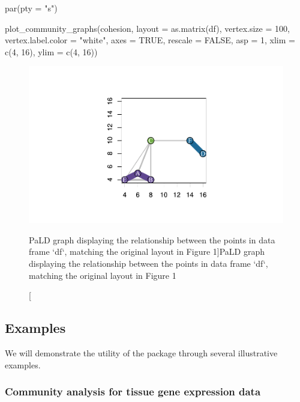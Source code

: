 \begin{Schunk}
\begin{Sinput}
par(pty = "s")

plot_community_graphs(cohesion, 
                      layout = as.matrix(df),
                      vertex.size = 100,
                      vertex.label.color = "white",
                      axes = TRUE,
                      rescale = FALSE,
                      asp = 1,
                      xlim = c(4, 16),
                      ylim = c(4, 16))
\end{Sinput}
\begin{figure}
\includegraphics{dagostino-mcgowan_files/figure-latex/fig3-1} \caption[PaLD graph displaying the relationship between the points in data frame `df`, matching the original layout in Figure 1]{PaLD graph displaying the relationship between the points in data frame `df`, matching the original layout in Figure 1}\label{fig:fig3}
\end{figure}
\end{Schunk}

\hypertarget{examples}{%
\subsection{Examples}\label{examples}}

We will demonstrate the utility of the  package through
several illustrative examples.

\hypertarget{community-analysis-for-tissue-gene-expression-data}{%
\subsubsection{Community analysis for tissue gene expression
data}\label{community-analysis-for-tissue-gene-expression-data}}

